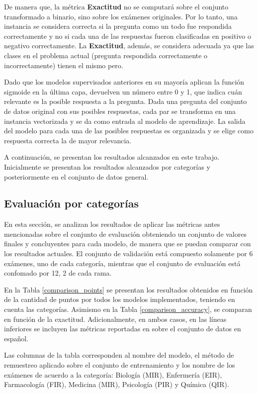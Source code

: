 De manera que, la métrica \textbf{Exactitud} no se computará sobre el conjunto transformado a binario, sino sobre los exámenes originales. Por lo tanto, una instancia se considera correcta si la pregunta como un todo fue respondida correctamente y no si cada una de las respuestas fueron clasificadas en positivo o negativo correctamente. La \textbf{Exactitud}, además, se considera adecuada ya que las clases en el problema actual (pregunta respondida correctamente o incorrectamente) tienen el mismo pero.

Dado que los modelos supervisados anteriores en su mayoría aplican la función sigmoide en la última capa, devuelven un número entre 0 y 1, que indica cuán relevante es la posible respuesta a la pregunta. Dada una pregunta del conjunto de datos original con sus posibles respuestas, cada par se transforma en una instancia vectorizada y se da como entrada al modelo de aprendizaje. La salida del modelo para cada una de las posibles respuestas es organizada y se elige como respuesta correcta la de mayor relevancia.

A continuación, se presentan los resultados alcanzados en este trabajo. Inicialmente se presentan los resultados alcanzados por categorías y posteriormente en el conjunto de datos general.

\subsection{Evaluación por categorías}

En esta sección, se analizan los resultados de aplicar las métricas antes mencionadas sobre el conjunto de evaluación obteniendo un conjunto de valores finales y concluyentes para cada modelo, de manera que se puedan comparar con los resultados actuales. El conjunto de validación está compuesto solamente por 6 exámenes, uno de cada categoría, mientras que el conjunto de evaluación está confomado por 12, 2 de cada rama.

En la Tabla \ref{comparison_points} se presentan los resultados obtenidos en función de la cantidad de puntos por todos los modelos implementados, teniendo en cuenta las categorías. Asimismo en la Tabla \ref{comparison_accuracy}, se comparan en función de la exactitud. Adicionalmente, en ambos casos, en las líneas inferiores se incluyen las métricas reportadas en \cite{2019-head-qa} sobre el conjunto de datos en español. 

Las columnas de la tabla corresponden al nombre del modelo, el método de remuestreo aplicado sobre el conjunto de entrenamiento y los nombre de los exámenes de acuerdo a la categoría: Biología (MIR), Enfermería (EIR), Farmacología (FIR), Medicina (MIR), Psicología (PIR) y Química (QIR). 

